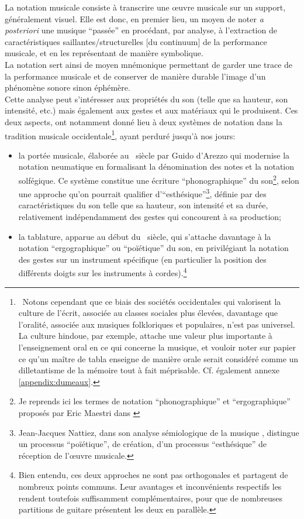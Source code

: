 \noindent La notation musicale consiste à transcrire une œuvre musicale sur un support, généralement visuel. Elle est donc, en premier lieu, un moyen de noter \textit{a posteriori} une musique ``passée'' en procédant, par analyse, à l'extraction de caractéristiques saillantes/structurelles [du continuum] de la performance musicale, et en les représentant de manière symbolique.\\
\indent La notation sert ainsi de moyen mnémonique permettant de garder une trace de la performance musicale et de conserver de manière durable l'image d'un phénomène sonore sinon éphémère.\\
\indent Cette analyse peut s'intéresser aux propriétés du son (telle que sa hauteur, son intensité, etc.) mais également aux gestes et aux matériaux qui le produisent. Ces deux aspects, ont notamment donné lieu à deux systèmes de notation dans la tradition musicale occidentale\footnote{~Notons cependant que ce biais des sociétés occidentales qui valorisent la culture de l'écrit, associée au classes sociales plus élevées, davantage que l'oralité, associée aux musiques folkloriques et populaires, n'est pas universel. La culture hindoue, par exemple, attache une valeur plus importante à l'enseignement oral en ce qui concerne la musique, et vouloir noter sur papier ce qu'un maître de tabla enseigne de manière orale serait considéré comme un dilletantisme de la mémoire tout à fait méprisable. Cf. également annexe \ref{appendix:dumeaux}.}, ayant perduré jusqu'à nos jours:
\vspace{-1em}
\begin{itemize}[noitemsep]
	\item la portée musicale, élaborée au ~siècle par Guido d'Arezzo qui modernise la notation neumatique en formalisant la dénomination des notes et la notation solfégique. Ce système constitue une écriture ``phonographique'' du son\footnote{Je reprends ici les termes de notation ``phonographique'' et ``ergographique'' proposés par Eric Maestri dans \cite{maestri_notation_2016}}, selon une approche qu'on pourrait qualifier d'``esthésique''\footnote{Jean-Jacques Nattiez, dans son analyse sémiologique de la musique \cite{nattiez_musicologie_1987}, distingue un processus ``poïétique'', de création, d'un processus ``esthésique'' de réception de l'œuvre musicale.}, définie par des caractéristiques du son telle que sa hauteur, son intensité et sa durée, relativement indépendamment des gestes qui concourent à sa production;
	\item la tablature, apparue au début du ~siècle, qui s'attache davantage à la notation ``ergographique'' ou ``poïétique'' du son, en privilégiant la notation des gestes sur un instrument spécifique (en particulier la position des différents doigts sur les instruments à cordes).\footnote{Bien entendu, ces deux approches ne sont pas orthogonales et partagent de nombreux points communs. Leur avantages et inconvénients respectifs les rendent toutefois suffisamment complémentaires, pour que de nombreuses partitions de guitare présentent les deux en parallèle.}
\end{itemize}

